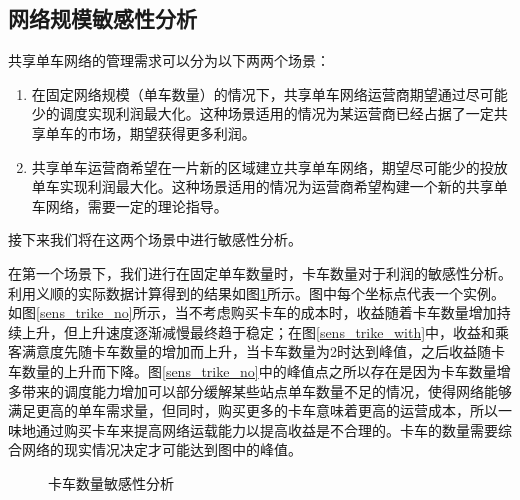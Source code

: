 \documentclass[]{tongjithesis}
\numberwithin{equation}{chapter}
\begin{document}
\subsection{网络规模敏感性分析}
共享单车网络的管理需求可以分为以下两两个场景：
\begin{enumerate}
	\item 在固定网络规模（单车数量）的情况下，共享单车网络运营商期望通过尽可能少的调度实现利润最大化。这种场景适用的情况为某运营商已经占据了一定共享单车的市场，期望获得更多利润。
	\item 共享单车运营商希望在一片新的区域建立共享单车网络，期望尽可能少的投放单车实现利润最大化。这种场景适用的情况为运营商希望构建一个新的共享单车网络，需要一定的理论指导。
\end{enumerate}

接下来我们将在这两个场景中进行敏感性分析。

在第一个场景下，我们进行在固定单车数量时，卡车数量对于利润的敏感性分析。利用义顺的实际数据计算得到的结果如图\ref{sens_trike}所示。图中每个坐标点代表一个实例。如图\ref{sens_trike_no}所示，当不考虑购买卡车的成本时，收益随着卡车数量增加持续上升，但上升速度逐渐减慢最终趋于稳定；在图\ref{sens_trike_with}中，收益和乘客满意度先随卡车数量的增加而上升，当卡车数量为2时达到峰值，之后收益随卡车数量的上升而下降。图\ref{sens_trike_no}中的峰值点之所以存在是因为卡车数量增多带来的调度能力增加可以部分缓解某些站点单车数量不足的情况，使得网络能够满足更高的单车需求量，但同时，购买更多的卡车意味着更高的运营成本，所以一味地通过购买卡车来提高网络运载能力以提高收益是不合理的。卡车的数量需要综合网络的现实情况决定才可能达到图中的峰值。
\begin{figure}[H]
	\centering
	\hfil
	\hfil
	\caption{卡车数量敏感性分析}
	\label{sens_trike}
\end{figure}
\end{document}
